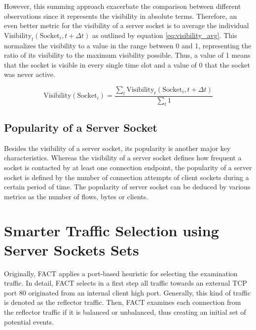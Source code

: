 However, this summing approach exacerbate the comparison between different observations since it represents the visibility in absolute terms. Therefore, an even better metric for the visibility of a \gls{server socket} is to average the individual $\text{Visibility}_t(\text{Socket}_i,t+\Delta{t})$ as outlined by equation \ref{eq:visibility_avg}. This normalizes the visibility to a value in the range between 0 and 1, representing the ratio of its visibility to the maximum visibility possible. Thus, a value of 1 means that the socket is visible in every single time slot and a value of 0 that the socket was never active.

\begin{equation}
	\overline{\text{Visibility}}(\text{Socket}_i) = \frac{\sum_{t} \text{Visibility}_t(\text{Socket}_i,t+\Delta{t})}{\sum_{t}1}
	\label{eq:visibility_avg}
\end{equation}

\subsection{Popularity of a Server Socket}

Besides the visibility of a \gls{server socket}, its popularity is another major key characteristics. Whereas the visibility of a \gls{server socket} defines how frequent a socket is contacted by at least one connection endpoint, the popularity of a \gls{server socket} is defined by the number of connection attempts of client sockets during a certain period of time. The popularity of \gls{server socket} can be deduced by various metrics as the number of flows, bytes or clients.

\section{Smarter Traffic Selection using Server Sockets Sets 
\label{section:ses_traffic_selection}}

Originally, \gls{FACT} applies a port-based heuristic for selecting the  examination traffic.  
In detail, \gls{FACT} selects in a first step all traffic towards an external  \gls{TCP} port 80 originated from an internal client high port. 
Generally, this kind of traffic is denoted as the reflector traffic. 
Then, \gls{FACT} examines each connection from the reflector traffic if it is  balanced or unbalanced, thus creating an initial set of potential events. 

